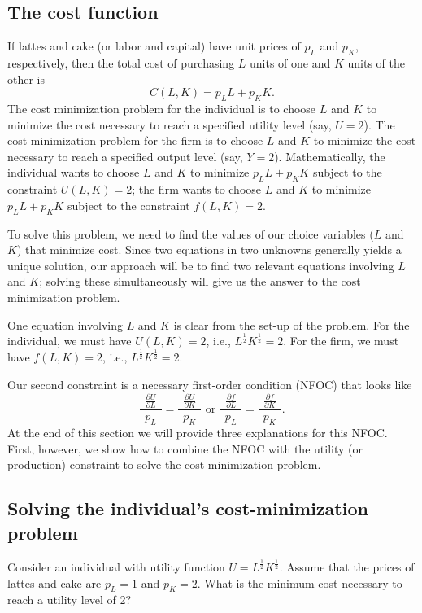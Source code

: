 \subsection*{The cost function}

If lattes and cake (or labor and capital) have unit prices of $p_L$ and $p_K$, respectively, then the total cost of purchasing $L$ units of one and $K$ units of the other is
\[
C(L, K)=p_L L + p_K K.
\]
The cost minimization problem for the individual is to choose $L$ and $K$ to minimize the cost necessary to reach a specified utility level (say, $U=2$). The cost minimization problem for the firm is to choose $L$ and $K$ to minimize the cost necessary to reach a specified output level (say, $Y=2$). Mathematically, the individual wants to choose $L$ and $K$ to minimize $p_L L + p_K K$ subject to the constraint $U(L, K)=2$; the firm wants to choose $L$ and $K$ to minimize $p_L L + p_K K$ subject to the constraint $f(L, K)=2$.

To solve this problem, we need to find the values of our choice variables ($L$ and $K$) that minimize cost. Since two equations in two unknowns generally yields a unique solution, our approach will be to find two relevant equations involving $L$ and $K$; solving these simultaneously will give us the answer to the cost minimization problem.

One equation involving $L$ and $K$ is clear from the set-up of the problem. For the individual, we must have $U(L, K)=2$, i.e., $L^{\frac{1}{2}}K^{\frac{1}{2}}=2$. For the firm, we must have $f(L, K)=2$, i.e., $L^{\frac{1}{2}}K^{\frac{1}{2}}=2$.

Our second constraint is a necessary first-order condition (NFOC) that looks like
\[
\frac{\ \ \frac{\partial U}{\partial L}\ \ }{p_L}=\frac{\ \
\frac{\partial U}{\partial K}\ \ }{p_K} \mbox{\ \ \ \ or \ \ \ \ }
\frac{\ \ \frac{\partial f}{\partial L}\ \ }{p_L}=\frac{\ \
\frac{\partial f}{\partial K}\ \ }{p_K}.
\]
At the end of this section we will provide three explanations for this NFOC. First, however, we show how to combine the NFOC with the utility (or production) constraint to solve the cost minimization problem.

\subsection*{Solving the individual's cost-minimization problem}\index{cost minimization!for an individual}

Consider an individual with utility function $U=L^{\frac{1}{2}}K^{\frac{1}{2}}$. Assume that the prices of lattes and cake are $p_L=1$ and $p_K=2$. What is the minimum cost necessary to reach a utility level of 2?

